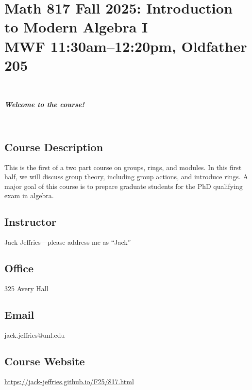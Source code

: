 \documentclass[12pt]{amsart}
\newcommand{\showsol}[1]{\def\displaysol{#1}}
\begin{document}
\showsol{0}
	
	\thispagestyle{empty}
	
	\section*{{\large Math 817 Fall 2025: Introduction to Modern Algebra I}\\ MWF 11:30am--12:20pm, Oldfather 205}
	
	\
	
	\begin{center}{ \textit{\textbf{Welcome to the course!}}}\end{center}
	
	\
	
		\subsection*{Course Description}

This is the first of a two part course on groups, rings, and modules. In this first half, we will discuss group theory, including group actions, and introduce rings. A major goal of this course is to prepare graduate students for the PhD qualifying exam in algebra.

	

	\subsection*{Instructor}  Jack Jeffries---please address me as ``Jack''
	


	\subsection*{Office}  325 Avery Hall

	\subsection*{Email}   jack.jeffries@unl.edu
	
	\subsection*{Course Website} \href{https://jack-jeffries.github.io/F25/817.html}{https://jack-jeffries.github.io/F25/817.html}
\end{document}
